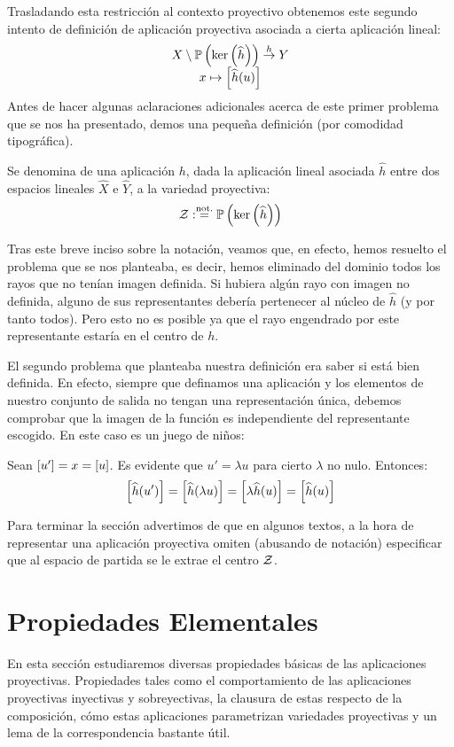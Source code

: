 Trasladando esta restricción al contexto proyectivo obtenemos este segundo intento de definición de aplicación proyectiva asociada a cierta aplicación lineal:
\[\begin{array}{c}
X\setminus\mathbb{P}\left(\ker\left(\widehat{h}\right)\right)\stackrel{h}{\to}Y\\
x\mapsto\left [ \widehat{h}(u) \right ]
\end{array}\]
Antes de hacer algunas aclaraciones adicionales acerca de este primer problema que se nos ha presentado, demos una pequeña definición (por comodidad tipográfica).
\begin{defi}[Centro]
	\label{C4_def_centro}
	Se denomina  de una aplicación $h$, dada la aplicación lineal asociada $\widehat{h}$ entre dos espacios lineales $\widehat{X}$ e $\widehat{Y}$, a la variedad proyectiva:
	\[\mathcal{Z}:\stackrel{\textrm{not.}}{=}\mathbb{P}\left(\ker\left(\widehat{h}\right)\right)\]
\end{defi}
Tras este breve inciso sobre la notación, veamos que, en efecto, hemos resuelto el problema que se nos planteaba, es decir, hemos eliminado del dominio todos los rayos que no tenían imagen definida. Si hubiera algún rayo con imagen no definida, alguno de sus representantes debería pertenecer al núcleo de $\widehat{h}$ (y por tanto todos). Pero esto no es posible ya que el rayo engendrado por este representante estaría en el centro de $h$.

El segundo problema que planteaba nuestra definición era saber si está bien definida. En efecto, siempre que definamos una aplicación y los elementos de nuestro conjunto de salida no tengan una representación única, debemos comprobar que la imagen de la función es independiente del representante escogido. En este caso es un juego de niños:

Sean $\left [ u' \right ]=x=\left [ u \right ]$. Es evidente que $u' = \lambda u$ para cierto $\lambda$ no nulo. Entonces:
\[\left [ \widehat{h}(u') \right ]=\left [ \widehat{h}(\lambda u) \right ]=\left [ \lambda\widehat{h}(u) \right ]=\left [ \widehat{h}(u) \right ]\]

Para terminar la sección advertimos de que en algunos textos, a la hora de representar una aplicación proyectiva omiten (abusando de notación) especificar que al espacio de partida se le extrae el centro $\mathcal{Z}$. 
\section{Propiedades Elementales}
En esta sección estudiaremos diversas propiedades básicas de las aplicaciones proyectivas. Propiedades tales como el comportamiento de las aplicaciones proyectivas inyectivas y sobreyectivas, la clausura de estas respecto de la composición, cómo estas aplicaciones parametrizan variedades proyectivas y un lema de la correspondencia bastante útil.

